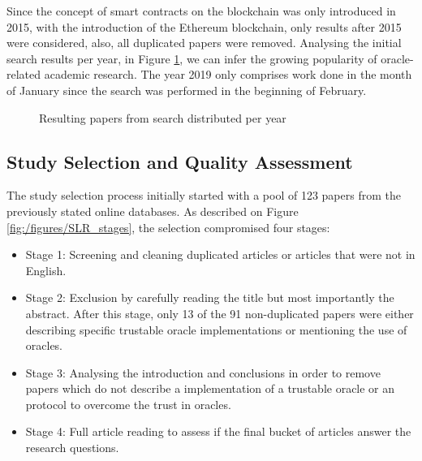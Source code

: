 Since the concept of smart contracts on the blockchain was only introduced in 2015, with the introduction of the Ethereum blockchain, only results after 2015 were considered, also, all duplicated papers were removed. Analysing the initial search results per year, in Figure \ref{search-results-per-year}, we can infer the growing popularity of oracle-related academic research. The year 2019 only comprises work done in the month of January since the search was performed in the beginning of February. 

\begin{figure}[H]
\centering
{}
\caption{Resulting papers from search distributed per year}
\label{search-results-per-year}
\end{figure}


\subsection{Study Selection and Quality Assessment}

The study selection process initially started with a pool of 123 papers from the previously stated online databases. As described on Figure \ref{fig:/figures/SLR_stages}, the selection compromised four stages:
\begin{itemize}
\item Stage 1: Screening and cleaning duplicated articles or articles that were not in English.
\item Stage 2: Exclusion by carefully reading the title but most importantly the abstract. After this stage, only 13 of the 91 non-duplicated papers were either describing specific trustable oracle implementations or mentioning the use of oracles.
\item Stage 3: Analysing the introduction and conclusions in order to remove papers which do not describe a implementation of a trustable oracle or an protocol to overcome the trust in oracles.
\item Stage 4: Full article reading to assess if the final bucket of articles answer the research questions.
\end{itemize} 

